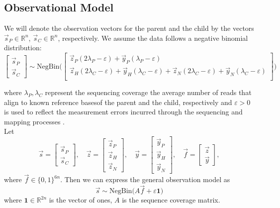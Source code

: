 \documentclass{article}
\def\R{\mathbb{R}} %
\newcommand{\sP}{\vec{s}_P }
\newcommand{\sC}{\vec{s}_C }
\newcommand{\sN}{\vec{s}_N }
\newcommand{\zP}{\vec{z}_P }
\newcommand{\zH}{\vec{z}_H }
\newcommand{\zN}{\vec{z}_N }
\newcommand{\yP}{\vec{y}_P }
\newcommand{\yH}{\vec{y}_H }
\newcommand{\yN}{\vec{y}_N }
\begin{document}
	
	\subsection{Observational Model}
	We will denote the observation vectors for the parent and the child by the vectors $\sP \in \R^n$, $\sC \in \R^n$, respectively. We assume the data follows a negative binomial distribution:
	\begin{equation} \label{observational_model}
		\begin{bmatrix}
			\sP \\
			\sC
		\end{bmatrix}
		\sim \text{NegBin}
		\Bigg( \begin{bmatrix}
			\zP (2 \lambda_P - \varepsilon) + \yP (\lambda_P - \varepsilon) \\
			\zH (2 \lambda_C - \varepsilon) + \yH (\lambda_C - \varepsilon) + \zN (2 \lambda_C - \varepsilon) + \yN (\lambda_C - \varepsilon) \\
		\end{bmatrix} \Bigg)
	\end{equation}
	
	where $\lambda_P, \lambda_C$ represent the sequencing coverage \textemdash the average number of reads that align to known reference bases\textemdash of the parent and the child, respectively  and $\varepsilon >0$ is used to reflect the measurement errors incurred through the sequencing and mapping processes \cite{MB_diploidTrios, lazar_2021}. \\
	Let 
	$$
	\vec{s} = \begin{bmatrix}
		\sP \\ \sC %
	\end{bmatrix}, \quad 
	\vec{z} = \begin{bmatrix}
		\zP \\ \zH \\ \zN
	\end{bmatrix}, \quad 
	\vec{y} = \begin{bmatrix}
		\yP \\ \yH \\ \yN
	\end{bmatrix}, \quad  
	\vec{f} = \begin{bmatrix}
		\vec{z} \\ \vec{y}
	\end{bmatrix}, 
	$$
	where $\vec{f} \in \{0,1\}^{6n}$. Then we can express the general observation model as
	$$ \vec{s} \sim \text{NegBin}(A \vec{f} + \varepsilon \mathbf{1)}$$
	where $\mathbf{1} \in \R^{2n}$ is the vector of ones, $A$ is the sequence coverage matrix. 
	
\end{document}
